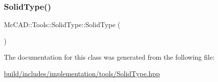 \subsubsection{\texorpdfstring{Solid\+Type()}{SolidType()}\hspace{0.1cm}{\footnotesize\ttfamily [2/2]}}
{\footnotesize\ttfamily Mc\+C\+A\+D\+::\+Tools\+::\+Solid\+Type\+::\+Solid\+Type (\begin{DoxyParamCaption}{ }\end{DoxyParamCaption})\hspace{0.3cm}{\ttfamily [default]}}



The documentation for this class was generated from the following file\+:\begin{DoxyCompactItemize}
\item 
\hyperlink{build_2includes_2implementation_2tools_2SolidType_8hpp}{build/includes/implementation/tools/\+Solid\+Type.\+hpp}\end{DoxyCompactItemize}
